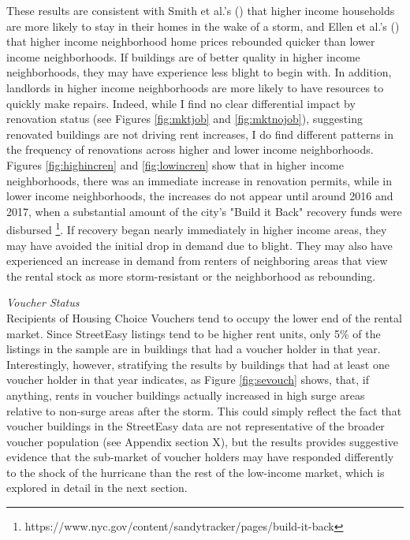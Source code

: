 \documentclass[12pt]{article}
\begin{document}
{{{{{These results are consistent with Smith et al.'s (\citeyear{smith_adjusting_2006}) that higher income households are more likely to stay in their homes in the wake of a storm, and Ellen et al.'s (\citeyear{ellen_heterogeneity_2022}) that higher income neighborhood home prices rebounded quicker than lower income neighborhoods.  If buildings are of better quality in higher income neighborhoods, they may have experience less blight to begin with. In addition, landlords in higher income neighborhoods are more likely to have resources to quickly make repairs.  Indeed, while I find no clear differential impact by renovation status (see Figures \ref{fig:mktjob} and \ref{fig:mktnojob}), suggesting renovated buildings are not driving rent increases, I do find different patterns in the frequency of renovations across higher and lower income neighborhoods.   Figures \ref{fig:highincren} and \ref{fig:lowincren} show that in higher income neighborhoods, there was an immediate increase in renovation permits, while in lower income neighborhoods, the increases do not appear until around 2016 and 2017, when a substantial amount of the city's "Build it Back" recovery funds were disbursed \footnote{https://www.nyc.gov/content/sandytracker/pages/build-it-back}.  If recovery began nearly immediately in higher income areas, they may have avoided the initial drop in demand due to blight.  They may also have experienced an increase in demand from renters of neighboring areas that view the rental stock as more storm-resistant or the neighborhood as rebounding.


\textit{Voucher Status} \\
Recipients of Housing Choice Vouchers tend to occupy the lower end of the rental market.  Since StreetEasy listings tend to be higher rent units, only 5\% of the listings in the sample are in buildings that had a voucher holder in that year.  Interestingly, however, stratifying the results by buildings that had at least one voucher holder in that year indicates, as Figure \ref{fig:sevouch} shows, that, if anything, rents in voucher buildings actually increased in high surge areas relative to non-surge areas after the storm.  This could simply reflect the fact that voucher buildings in the StreetEasy data are not representative of the broader voucher population (see Appendix section X), but the results provides suggestive evidence that the sub-market of voucher holders may have responded differently to the shock of the hurricane than the rest of the low-income market, which is explored in detail in the next section. 

}}}}}
\end{document}
